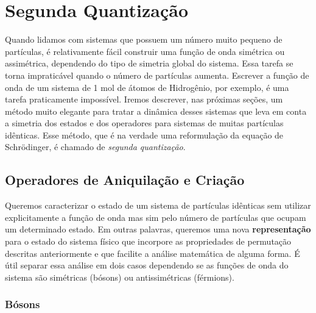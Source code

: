 \documentclass{article}
\begin{document}
\section{Segunda Quantização}

Quando lidamos com sistemas que possuem um número muito pequeno de partículas, é relativamente fácil construir uma função de onda simétrica ou assimétrica, dependendo do tipo de simetria global do sistema. Essa tarefa se torna impraticável quando o número de partículas aumenta. Escrever a função de onda de um sistema de 1 mol de átomos de Hidrogênio, por exemplo, é uma tarefa praticamente impossível. Iremos descrever, nas próximas seções, um método muito elegante para tratar a dinâmica desses sistemas que leva em conta a simetria dos estados e dos operadores para sistemas de muitas partículas idênticas. Esse método, que é na verdade uma reformulação da equação de Schrödinger, é chamado de \textit{segunda quantização}.

\subsection{Operadores de Aniquilação e Criação}

Queremos caracterizar o estado de um sistema de partículas idênticas sem utilizar explicitamente a função de onda mas sim pelo número de partículas que ocupam um determinado estado. Em outras palavras, queremos uma nova \textbf{representação} para o estado do sistema físico que incorpore as propriedades de permutação descritas anteriormente e que facilite a análise matemática de alguma forma. É útil separar essa análise em dois casos dependendo se as funções de onda do sistema são simétricas (bósons) ou antissimétricas (férmions).

\subsubsection{Bósons}
\end{document}
